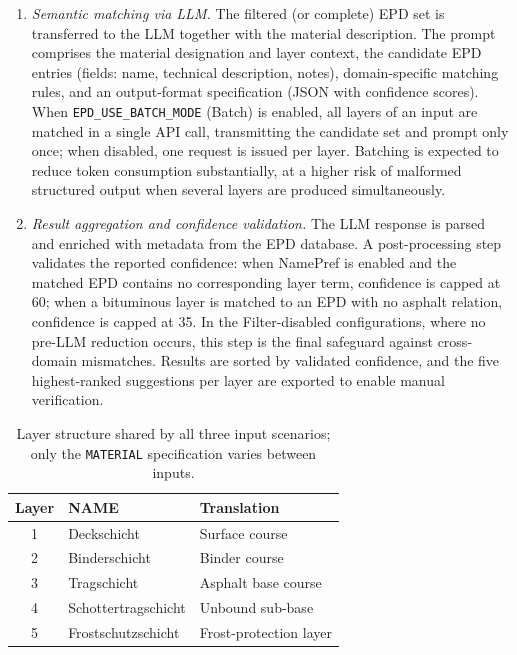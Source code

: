 \documentclass[10pt, a4paper, twocolumn]{article}
\begin{document}
\begin{enumerate}[leftmargin=*, itemsep=3pt, topsep=3pt, label=\arabic*.]
\item \textit{Semantic matching via LLM.} The filtered (or complete) EPD set is
transferred to the LLM together with the material description. The prompt comprises
the material designation and layer context, the candidate EPD entries (fields:
name, technical description, notes), domain-specific matching rules, and an
output-format specification (JSON with confidence scores). When
\texttt{EPD\_USE\_BATCH\_MODE} (Batch) is enabled, all layers of an input are
matched in a single API call, transmitting the candidate set and prompt only once;
when disabled, one request is issued per layer. Batching is expected to reduce
token consumption substantially, at a higher risk of malformed structured output
when several layers are produced simultaneously.

\item \textit{Result aggregation and confidence validation.} The LLM response is
parsed and enriched with metadata from the EPD database. A post-processing step
validates the reported confidence: when NamePref is enabled and the matched EPD
contains no corresponding layer term, confidence is capped at 60; when a bituminous
layer is matched to an EPD with no asphalt relation, confidence is capped at 35. In
the Filter-disabled configurations, where no pre-LLM reduction occurs, this step is
the final safeguard against cross-domain mismatches. Results are sorted by validated
confidence, and the five highest-ranked suggestions per layer are exported to enable
manual verification.

\end{enumerate}

\begin{table}[htbp]
  \caption{Layer structure shared by all three input scenarios; only the
           \texttt{MATERIAL} specification varies between inputs.}
  \label{tab:layers}
  \centering
  \small
  \begin{tabular}{cll}
    \toprule
    \textbf{Layer} & \textbf{NAME} & \textbf{Translation} \\
    \midrule
    1 & Deckschicht         & Surface course        \\
    2 & Binderschicht       & Binder course         \\
    3 & Tragschicht         & Asphalt base course   \\
    4 & Schottertragschicht & Unbound sub-base      \\
    5 & Frostschutzschicht  & Frost-protection layer\\
    \bottomrule
  \end{tabular}
\end{table}
\end{document}
